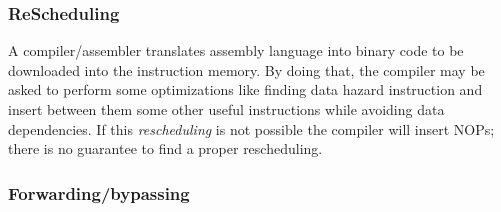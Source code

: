 \subsubsection{ReScheduling}
   A compiler/assembler translates assembly language into binary code to be
   downloaded into the instruction memory. By doing that, the compiler may be
   asked to perform some optimizations like finding data hazard instruction and
   insert between them some other useful instructions while avoiding data
   dependencies. If this \textit{rescheduling} is not possible the compiler will insert
   NOPs; there is no guarantee to find a proper rescheduling.







\subsubsection{Forwarding/bypassing}

